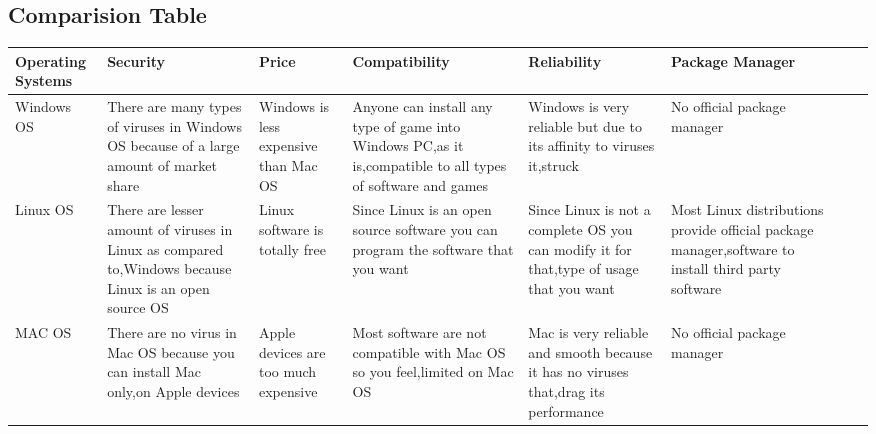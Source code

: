\documentclass{scrreprt}
\begin{document}
\subsection{Comparision Table}

\begin{tabular}{|l|l|l|l|l|l|l|l|}
\hline
Operating Systems & Security                                                                                              & Price                                 & Compatibility                                                                                              & Reliability                                                                             & Package Manager                                                                                   \\ \hline
\parbox{2cm}{Windows OS}        & \parbox{3cm}{There are many types of viruses in Windows OS because of a large amount of market share}               & \parbox{2cm}{Windows is less expensive than Mac OS} & \parbox{3cm}{ Anyone can install any type of game into Windows PC,as it is,compatible to all types of software and games} & \parbox{2cm}{Windows is very reliable but due to its affinity to viruses it,struck }                  & \parbox{2cm}{No official package manager}                                                                         \\ \hline
\parbox{2cm}{Linux OS}         & \parbox{3cm}{There are lesser amount of viruses in Linux as compared to,Windows because Linux is an open source OS} & \parbox{2cm}{ Linux software is totally free}        & \parbox{3cm}{ Since Linux is an open source software you can program the software that you want}  & \parbox{2cm}{Since Linux is not a complete OS you can modify it for that,type of usage that you want} & \parbox{2cm}{Most Linux distributions provide official package manager,software to install third party software} \\ \hline
\parbox{2cm}{MAC OS}           & \parbox{3cm}{There are no virus in Mac OS because you can install Mac only,on Apple devices}      & \parbox{2cm}{Apple devices are too much expensive}  & \parbox{3cm}{Most software are not compatible with Mac OS so you feel,limited on Mac OS }                              & \parbox{2cm}{Mac is very reliable and smooth because it has no viruses that,drag its performance}     & \parbox{2cm}{No official package manager}                                                                       \\ \hline
\end{tabular}
\end{document}
